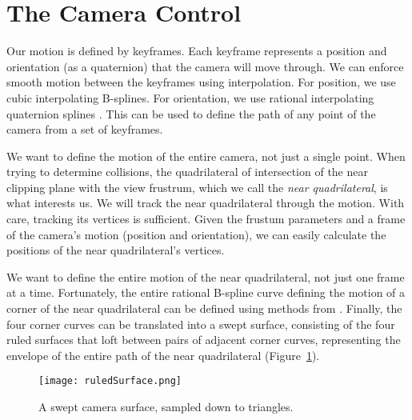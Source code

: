 \documentclass{sig-alternate}
\begin{document}
\section{The Camera Control}
Our motion is defined by keyframes.
Each keyframe represents a position and orientation (as a quaternion) 
that the camera will move through.
We can enforce smooth motion between the keyframes using interpolation.
For position, we use cubic interpolating B-splines.
For orientation, we use rational interpolating quaternion splines
\cite{jjjw95}.
This can be used to define the path of any point of the camera from a set of
keyframes.

We want to define the motion of the entire camera, not just a single
point.
When trying to determine collisions, the quadrilateral of intersection of the
near clipping plane with the view frustrum, which we call the 
\emph{near quadrilateral}, is what interests us.
We will track the near quadrilateral through the motion.
With care, tracking its vertices is sufficient.
Given the frustum parameters and a frame of the camera's motion (position and
orientation), we can easily calculate the positions of the near quadrilateral's
vertices.

We want to define the entire motion of the near quadrilateral, not just one
frame at a time.  
Fortunately, the entire rational B-spline curve defining the motion
of a corner of the near quadrilateral can be defined using methods from 
\cite{jjeuro95}.
Finally, the four corner curves can be translated into a swept surface,
consisting of the four ruled surfaces that loft between pairs of adjacent
corner curves, representing the envelope of the entire path of the near
quadrilateral (Figure~\ref{fig:viewfrustum}).

\clearpage

\begin{figure}
\begin{center}
\texttt{[image: ruledSurface.png]}
\end{center}
\caption{A swept camera surface, sampled down to triangles.}
\label{fig:viewfrustum}
\end{figure}
\end{document}
